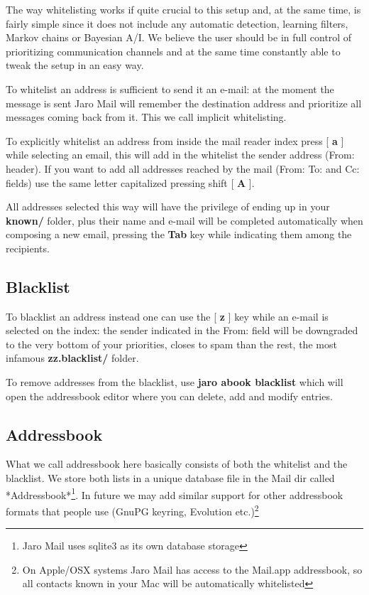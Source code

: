 \documentclass[a4,onecolumn,portrait]{article}
\begin{document}
The way whitelisting works if quite crucial to this setup and, at the
same time, is fairly simple since it does not include any automatic
detection, learning filters, Markov chains or Bayesian A/I. We believe
the user should be in full control of prioritizing communication
channels and at the same time constantly able to tweak the setup in an
easy way.

To whitelist an address is sufficient to send it an e-mail: at the
moment the message is sent Jaro Mail will remember the destination
address and prioritize all messages coming back from it.
This we call implicit whitelisting.

To explicitly whitelist an address from inside the mail reader index
press [ \textbf{a} ] while selecting an email, this will add in the whitelist
the sender address (From: header). If you want to add all addresses
reached by the mail (From: To: and Cc: fields) use the same letter
capitalized pressing shift [ \textbf{A} ].

All addresses selected this way will have the privilege of ending up
in your \textbf{known/} folder, plus their name and e-mail will be completed
automatically when composing a new email, pressing the \textbf{Tab} key while
indicating them among the recipients.
\subsection{Blacklist}
\label{sec-5-3}

To blacklist an address instead one can use the [ \textbf{z} ] key while an
e-mail is selected on the index: the sender indicated in the From:
field will be downgraded to the very bottom of your priorities, closes
to spam than the rest, the most infamous \textbf{zz.blacklist/} folder.

To remove addresses from the blacklist, use \textbf{jaro abook blacklist} which will open the addressbook editor where you can delete, add and modify entries.
\subsection{Addressbook}
\label{sec-5-4}

What we call addressbook here basically consists of both the whitelist
and the blacklist. We store both lists in a unique database file in
the Mail dir called *Addressbook*\footnote{Jaro Mail uses sqlite3 as its own database storage}.  In future we may add
similar support for other addressbook formats that people use (GnuPG
keyring, Evolution etc.)\footnote{On Apple/OSX systems Jaro Mail has access to the Mail.app addressbook, so all contacts known in your Mac will be automatically whitelisted}
\end{document}
